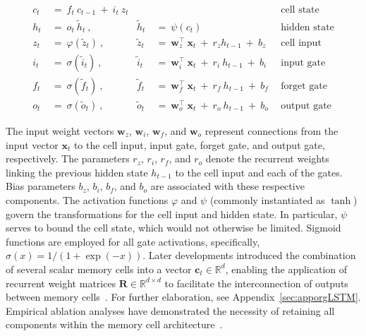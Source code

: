 \begin{align}
c_t \ &= \  f_t \ c_{t-1} \ + \ i_t \ z_t &  & &\text{cell state} \\
h_t  \ &= \ o_t \ \tilde{h}_t \ , & \tilde{h}_t \ &= \ \psi \left( c_t\right)
  &\text{hidden state} \\
z_t \ &= \ \varphi \left( \tilde{z}_t \right) \ , 
  &\tilde{z}_t \ &=  \ \mathbf{w}^\top_{z} \ \mathbf{x}_t \ + \
  r_{z}  h_{t-1} \ + \  b_{z} \ \
  &\text{cell input} \\
i_t \ &= \ \sigma \left( \tilde{i}_t  \right) \ , 
  &\tilde{i}_t \ &= \ \mathbf{w}^\top_{i} \ \mathbf{x}_t \ + \
  r_{i}  \ h_{t-1} \ + \  b_{i} \ \
  &\text{input gate} \\
f_t \ &= \ \sigma \left(  \tilde{f}_t \right) \ , 
  &\tilde{f}_t \ &= \ \mathbf{w}^\top_{f} \ \mathbf{x}_t  \ + \
  r_{f}  \ h_{t-1} \ + \  b_{f} \ \
  &\text{forget gate} \\
o_t \ &= \ \sigma \left( \tilde{o}_t \right) \ , 
  &\tilde{o}_t  \ &= \ \mathbf{w}^\top_{o} \ \mathbf{x}_t \ + \
  r_{o}  \ h_{t-1} \ + \  b_{o} \ \
  &\text{output gate} 
\end{align}

The input weight vectors $\mathbf{w}_{z}$, $\mathbf{w}_{i}$, $\mathbf{w}_{f}$, and $\mathbf{w}_{o}$ represent connections from the input vector $\mathbf{x}_t$ to the cell input, input gate, forget gate, and output gate, respectively. The parameters $r_{z}$, $r_{i}$, $r_{f}$, and $r_{o}$ denote the recurrent weights linking the previous hidden state $h_{t-1}$ to the cell input and each of the gates. Bias parameters $b_{z}$, $b_{i}$, $b_{f}$, and $b_{o}$ are associated with these respective components. The activation functions $\varphi$ and $\psi$ (commonly instantiated as $\tanh$) govern the transformations for the cell input and hidden state. In particular, $\psi$ serves to bound the cell state, which would not otherwise be limited. Sigmoid functions are employed for all gate activations, specifically, $\sigma \left( x \right)= 1/(1+\exp(-x))$. Later developments introduced the combination of several scalar memory cells into a vector $\mathbf{c}_t \in \mathbb{R}^d$, enabling the application of recurrent weight matrices $\mathbf{R} \in \mathbb{R}^{d \times d}$ to facilitate the interconnection of outputs between memory cells~\citep{Greff:15}. For further elaboration, see Appendix~\ref{sec:apporgLSTM}. Empirical ablation analyses have demonstrated the necessity of retaining all components within the memory cell architecture~\citep{Greff:15}.


